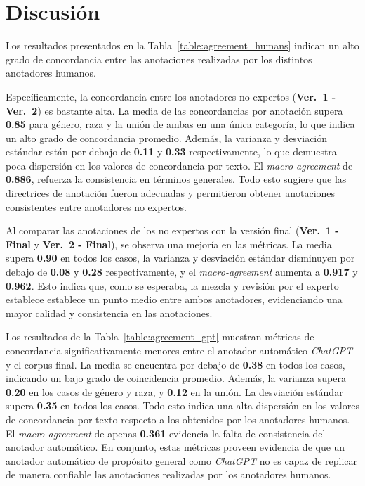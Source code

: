 \section{Discusi\'on}
Los resultados presentados en la Tabla~\ref{table:agreement_humans} indican un alto grado de concordancia entre las 
anotaciones realizadas por los distintos anotadores humanos.

Espec\'ificamente, la concordancia entre los anotadores no expertos (\textbf{Ver.~1 - Ver.~2}) es bastante alta. La
media de las concordancias por anotaci\'on supera \textbf{0.85} para g\'enero, raza y la uni\'on de ambas en una \'unica categor\'ia,
lo que indica un alto grado de concordancia promedio. Adem\'as, la varianza y desviaci\'on est\'andar est\'an por debajo de 
\textbf{0.11} y \textbf{0.33} respectivamente, lo que demuestra poca dispersi\'on en los valores de concordancia por texto. El
\emph{macro-agreement} de \textbf{0.886}, refuerza la consistencia en t\'erminos generales. Todo esto sugiere que las directrices 
de anotaci\'on fueron adecuadas y permitieron obtener anotaciones consistentes entre anotadores no expertos.

Al comparar las anotaciones de los no expertos con la versi\'on final (\textbf{Ver.~1 - Final} y \textbf{Ver.~2 - Final}), se
observa una mejor\'ia en las m\'etricas. La media supera \textbf{0.90} en todos los casos, la varianza y desviaci\'on est\'andar
disminuyen por debajo de \textbf{0.08} y \textbf{0.28} respectivamente, y el \emph{macro-agreement} aumenta a \textbf{0.917} y 
\textbf{0.962}. Esto indica que, como se esperaba, la mezcla y revisi\'on por el experto establece establece un punto medio entre ambos anotadores, evidenciando una mayor calidad y consistencia en las anotaciones.

Los resultados de la Tabla~\ref{table:agreement_gpt} muestran m\'etricas de concordancia significativamente menores entre 
el anotador autom\'atico \emph{ChatGPT} y el corpus final. La media se encuentra por debajo de \textbf{0.38} en todos los casos,
indicando un bajo grado de coincidencia promedio. Adem\'as, la varianza supera \textbf{0.20} en los casos de g\'enero y raza, y 
\textbf{0.12} en la uni\'on. La desviaci\'on est\'andar supera \textbf{0.35} en todos los casos. Todo esto indica una alta 
dispersi\'on en los valores de concordancia por texto respecto a los obtenidos por los anotadores humanos. El 
\emph{macro-agreement} de apenas \textbf{0.361} evidencia la falta de consistencia del anotador autom\'atico. En conjunto, estas
m\'etricas proveen evidencia de que un anotador autom\'atico de prop\'osito general como \emph{ChatGPT} no es capaz de replicar
de manera confiable las anotaciones realizadas por los anotadores humanos.  

